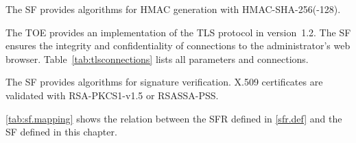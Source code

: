 
The SF provides algorithms for HMAC generation with HMAC-SHA-256(-128).



The TOE provides an implementation of the TLS protocol in version~1.2. The SF
ensures the integrity and confidentiality of connections to the administrator's
web browser. Table~\vref{tab:tlsconnections} lists all parameters and connections.


The SF  provides algorithms for signature
verification. X.509 certificates are validated with RSA-PKCS1-v1.5 or
RSASSA-PSS.



\pagebreak


\autoref{tab:sf.mapping} shows the relation between the SFR defined in
\autoref{sfr.def} and the SF defined in this chapter.




